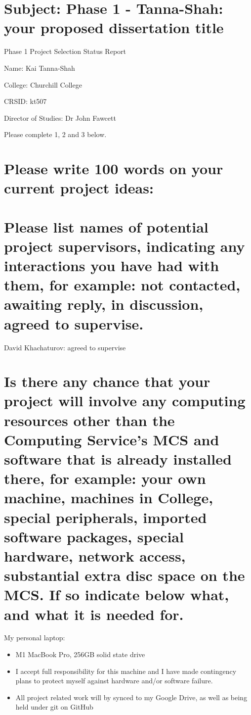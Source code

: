 \documentclass[10pt,a4paper]{article}
\begin{document}
\section*{Subject: Phase 1 - Tanna-Shah: your proposed dissertation title}

Phase 1 Project Selection Status Report

Name: Kai Tanna-Shah

College: Churchill College

CRSID: kt507

Director of Studies: Dr John Fawcett

Please complete 1, 2 and 3 below.
\section{Please write 100 words on your current project ideas:} 



\section{Please list names of potential project supervisors, indicating
any interactions you have had with them, for example: not
contacted, awaiting reply, in discussion, agreed to supervise.}

David Khachaturov: agreed to supervise


\section{Is there any chance that your project will involve any
computing resources other than the Computing Service's MCS and
software that is already installed there, for example: your own
machine, machines in College, special peripherals, imported
software packages, special hardware, network access, substantial
extra disc space on the MCS. 
If so indicate below what, and what it is needed for.}

My personal laptop:
\begin{itemize}
    \item M1 MacBook Pro, 256GB solid state drive
    \item I accept full responsibility for this machine and I have made contingency plans to protect myself against hardware and/or software failure.
    \item All project related work will by synced to my Google Drive, as well as being held under git on GitHub
\end{itemize}
\end{document}
